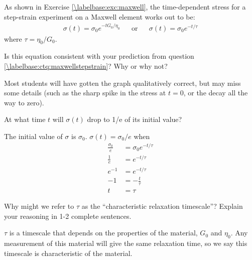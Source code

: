 \begin{activity}
\begin{ctqs}
\end{ctqs}

\begin{infobox}
	As shown in Exercise \ref{\labelbase:exc:maxwell}, the time-dependent stress for a step-strain experiment on a Maxwell element works out to be:
	\begin{align*}
		\sigma(t) = \sigma_0 e^{-t G_0/\eta_0}  && \text{or} && \sigma(t) = \sigma_0 e^{-t /\tau}
	\end{align*}
	where $\tau = \eta_0/G_0$.
\end{infobox}

\begin{ctqs}
	
	\question Is this equation consistent with your prediction from question \ref{\labelbase:ctq:maxwellstepstrain}?  Why or why not?
	
					\begin{solution}[1.75in]
					
						Most students will have gotten the graph qualitatively correct, but may miss some details (such as the sharp spike in the stress at $t=0$, or the decay all the way to zero).
					
					\end{solution}
		
	\question At what time $t$ will $\sigma(t)$ drop to 1/e of its initial value?
	
					\begin{solution}[1.75in]
						The initial value of $\sigma$ is $\sigma_0$.  $\sigma(t) = \sigma_0/e$ when
						\begin{align*}
							\frac{\sigma_0}{e} &= \sigma_0 e^{-t/\tau} \\
							\frac{1}{e} &= e^{-t/\tau}\\
							e^{-1} &= e^{-t/\tau}\\
							-1 &= -\frac{t}{\tau} \\
							t &= \tau
						\end{align*}
					\end{solution}
		
		\question Why might we refer to $\tau$ as the ``characteristic relaxation timescale''?  Explain your reasoning in 1-2 complete sentences.
	
					\begin{solution}[1.5in]
					
						$\tau$ is a timescale that depends on the properties of the material, $G_0$ and $\eta_0$.  Any measurement of this material will give the same relaxation time, so we say this timescale is characteristic of the material.
					

\end{solution}
\end{ctqs}
\end{activity}
